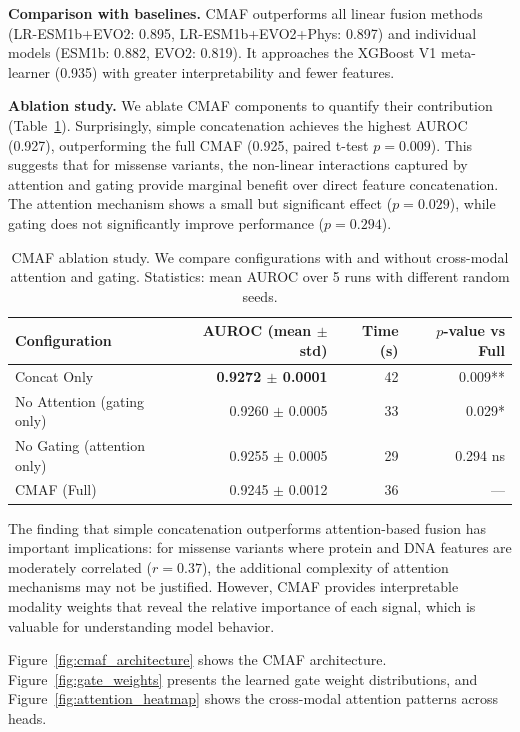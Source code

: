 \documentclass[9pt]{article}
\begin{document}
\textbf{Comparison with baselines.} CMAF outperforms all linear fusion methods (LR-ESM1b+EVO2: 0.895, LR-ESM1b+EVO2+Phys: 0.897) and individual models (ESM1b: 0.882, EVO2: 0.819). It approaches the XGBoost V1 meta-learner (0.935) with greater interpretability and fewer features.

\textbf{Ablation study.} \label{sec:ablation} We ablate CMAF components to quantify their contribution (Table~\ref{tab:cmaf_ablation}). Surprisingly, simple concatenation achieves the highest AUROC (0.927), outperforming the full CMAF (0.925, paired t-test $p = 0.009$). This suggests that for missense variants, the non-linear interactions captured by attention and gating provide marginal benefit over direct feature concatenation. The attention mechanism shows a small but significant effect ($p = 0.029$), while gating does not significantly improve performance ($p = 0.294$).

\begin{table}[h]
\centering
\caption{CMAF ablation study. We compare configurations with and without cross-modal attention and gating. Statistics: mean AUROC over 5 runs with different random seeds.}
\label{tab:cmaf_ablation}
\small
\begin{tabular}{lrrr}
\toprule
\textbf{Configuration} & \textbf{AUROC (mean $\pm$ std)} & \textbf{Time (s)} & \textbf{$p$-value vs Full} \\
\midrule
Concat Only & \textbf{0.9272 $\pm$ 0.0001} & 42 & 0.009** \\
No Attention (gating only) & 0.9260 $\pm$ 0.0005 & 33 & 0.029* \\
No Gating (attention only) & 0.9255 $\pm$ 0.0005 & 29 & 0.294 ns \\
CMAF (Full) & 0.9245 $\pm$ 0.0012 & 36 & --- \\
\bottomrule
\end{tabular}
\end{table}

The finding that simple concatenation outperforms attention-based fusion has important implications: for missense variants where protein and DNA features are moderately correlated ($r = 0.37$), the additional complexity of attention mechanisms may not be justified. However, CMAF provides interpretable modality weights that reveal the relative importance of each signal, which is valuable for understanding model behavior.

Figure~\ref{fig:cmaf_architecture} shows the CMAF architecture. Figure~\ref{fig:gate_weights} presents the learned gate weight distributions, and Figure~\ref{fig:attention_heatmap} shows the cross-modal attention patterns across heads.
\end{document}
